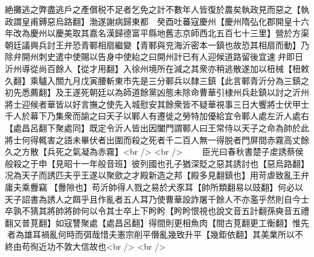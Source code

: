 絶攤逃之弊盡逃戶之產償税不足者乞免之計不數年人皆復於農矣執政見而惡之【執政謂皇甫鎛惡烏路翻】渤遂謝病歸東都　癸酉吐蕃寇慶州【慶州隋弘化郡開皇十六年改為慶州以慶美取其嘉名漢歸德富平縣地舊志京師西北五百七十三里】營於方渠　朝廷議興兵討王弁恐青鄆相扇繼變【青鄆與兖海沂密本一鎮也故恐其相扇而動】乃除弁開州刺史遣中使賜以告身中使紿之曰開州計已有人迎候道路留後宜速弁即日沂州導從尚百餘人【從才用翻】入徐州境所在減之其衆亦稍逃散遂加以杻械【杻敕久翻】乘驢入關九月戊寅腰斬東市先是三分鄆兵以隸三鎮【此言鄆青沂分為三鎮之初先悉薦翻】及王遂死朝廷以為師道餘黨凶態未除命曹華引棣州兵赴鎮以討之沂州將士迎候者華皆以好言撫之使先入城慰安其餘衆皆不疑華視事三日大饗將士伏甲士千人於幕下乃集衆而諭之曰天子以鄆人有遷徙之勞特加優給宜令鄆人處左沂人處右【處昌呂翻下聚處同】既定令沂人皆出因闔門謂鄆人曰王常侍以天子之命為帥於此將士何得輒害之語未畢伏者出圍而殺之死者千二百人無一得脱者門屏間赤霧高丈餘久之方散【兵死之氣凝為赤霧】<br />
<br />
　　臣光曰春秋書楚子䖍誘蔡侯般殺之于申【見昭十一年般音班】彼列國也孔子猶深貶之惡其誘討也【惡烏路翻】况為天子而誘匹夫乎王遂以聚歛之才殿新造之邦【殿多見翻鎮也】用苛虐致亂王弁庸夫乘釁竊【釁隙也】苟沂帥得人戮之易於犬豕耳【帥所類翻易以豉翻】何必以天子詔書為誘人之餌乎且作亂者五人耳乃使曹華設詐屠千餘人不亦濫乎然則自今士卒孰不猜其將帥將帥何以令其士卒上下盻盻【盻盻恨視也說文音五計翻孫奭音五禮翻又普莧翻】如寇讐聚處【處昌呂翻】得間則更相魚肉【間古莧翻更工衡翻】惟先者為雄耳禍亂何時而弭哉惜夫憲宗削平僭亂幾致升平【幾鉅依翻】其美業所以不終由苟徇近功不敦大信故也<br />
<br />
